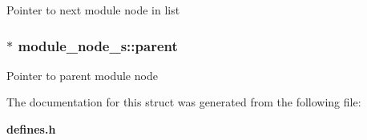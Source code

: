 Pointer to next module node in list 
\subsubsection{$\ast$ module\_\-node\_\-s::parent}\label{structmodule__node__s_m2}


Pointer to parent module node 

The documentation for this struct was generated from the following file:\begin{CompactItemize}
\item 
{\bf defines.h}\end{CompactItemize}
